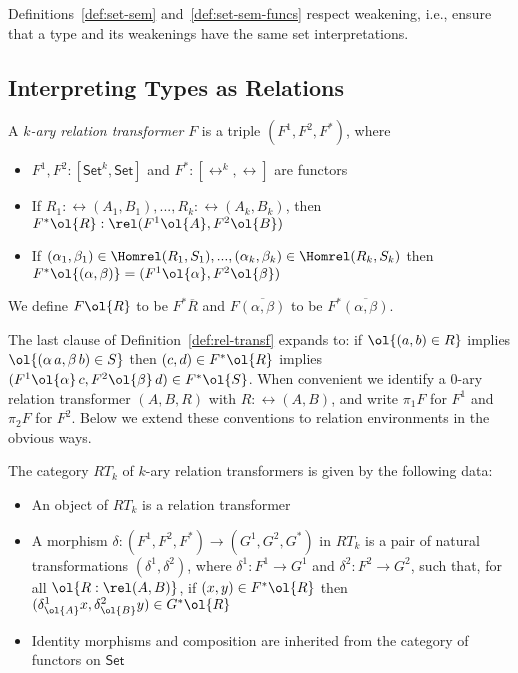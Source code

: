 \documentclass{lmcs}
\theoremstyle{plain}\newtheorem{satz}[thm]{Satz}
\newcommand{\set}{\mathsf{Set}}
\begin{document}
Definitions~\ref{def:set-sem} and~\ref{def:set-sem-funcs} respect
weakening, i.e., ensure that a type and its weakenings have the same
set interpretations.

\subsection{Interpreting Types as Relations}\label{sec:rel-interp}

\begin{defi}\label{def:rel-transf}
A {\em $k$-ary relation transformer} $F$ is a triple $(F^1, F^2,F^*)$,
where
\begin{itemize}
\item $F^1,F^2 : [\set^k,\set]$ and $F^* : [\rel^k, \rel]$ are
  functors
\item If $R_1:\rel(A_1,B_1),...,R_k:\rel(A_k,B_k)$, then $F^* \ol{R} :
  \rel(F^1 \ol{A}, F^2 \ol{B})$
\item If $(\alpha_1, \beta_1) \in \Homrel(R_1,S_1),..., (\alpha_k,
  \beta_k) \in \Homrel(R_k,S_k)$ then $F^* \ol{(\alpha, \beta)} = (F^1
  \ol{\alpha}, F^2 \ol{\beta})$
\end{itemize}
We define $F\ol{R}$ to be $F^*\overline{R}$ and
$F\overline{(\alpha,\beta)}$ to be $F^*\overline{(\alpha,\beta)}$.
\end{defi}
The last clause of Definition~\ref{def:rel-transf} expands to: if
$\ol{(a,b) \in R}$ implies $\ol{(\alpha\,a,\beta\,b) \in S}$ then
$(c,d) \in F^*\ol{R}$ implies $(F^1 \ol{\alpha}\,c,F^2 \ol{\beta}\,d)
\in F^*\ol{S}$. When convenient we identify a $0$-ary relation
transformer $(A,B,R)$ with $R : \rel(A,B)$, and write $\pi_1 F$ for
$F^1$ and $\pi_2 F$ for $F^2$. Below we extend these conventions to
relation environments in the obvious ways.

\begin{defi}
The category $RT_k$ of $k$-ary relation transformers is given by the
following data:
\begin{itemize}
\item An object of $RT_k$ is a relation transformer
\item A morphism $\delta : (F^1,F^2,F^*) \to (G^1,G^2,G^*)$ in $RT_k$
  is a pair of natural transformations $(\delta^1, \delta^2)$, where
  $\delta^1 : F^1 \to G^1$ and $\delta^2 : F^2 \to G^2$, such that,
  for all $\ol{R : \rel(A, B)}$, if $(x, y) \in F^*\ol{R}$ then
  $(\delta^1_{\ol{A}}x, \delta^2_{\ol{B}}y) \in G^*\ol{R}$
\item Identity morphisms and composition are inherited from the
  category of functors on $\set$
\end{itemize}
\end{defi}
\end{document}
